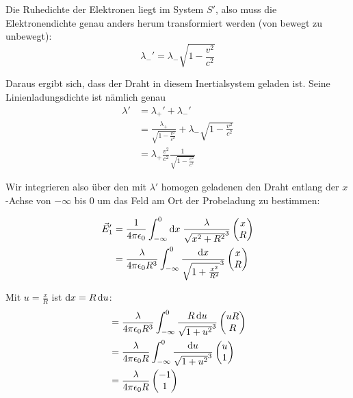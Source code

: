 \documentclass[a4paper,german,12pt,smallheadings]{scrartcl}
\begin{document}
Die Ruhedichte der Elektronen liegt im System $S'$, also muss die
Elektronendichte genau anders herum transformiert werden (von bewegt zu
unbewegt):
\begin{equation}
  \lambda_-' = \lambda_- \sqrt{1 - \frac{v^2}{c^2}}
\end{equation}

Daraus ergibt sich, dass der Draht in diesem Inertialsystem geladen ist. Seine
Linienladungsdichte ist nämlich genau
\begin{align*}
  \lambda' &= \lambda_+' + \lambda_-' \\
       &= \frac{\lambda_+}{\sqrt{1 - \frac{v^2}{c^2}}} + \lambda_- \sqrt{1 - \frac{v^2}{c^2}} \\
       &= \lambda_{+} \frac{v^2}{c^2} \frac{1}{\sqrt{1-\frac{v^2}{c^2}}}
\end{align*}

Wir integrieren also über den mit $\lambda'$ homogen geladenen den Draht
entlang der $x$-Achse von $-\infty$ bis $0$ um das Feld am Ort der Probeladung
zu bestimmen:

\begin{align*}
  \vec{E}'_1 &= \frac{1}{4 \pi \epsilon_0} \int_{-\infty}^0 \dif x \;
  \frac{\lambda}{\sqrt{x^2 + R^2}^3} \begin{pmatrix} x \\ R \end{pmatrix} \\
  &= \frac{\lambda}{4 \pi \epsilon_0 R^3} \int_{-\infty}^0
  \frac{\dif x}{\sqrt{1 + \frac{x^2}{R^2}}^3} \begin{pmatrix} x \\ R \end{pmatrix}
\end{align*}

Mit $u = \frac{x}{R}$ ist $\dif x = R \dif u$:
\begin{align*}
  &= \frac{\lambda}{4 \pi \epsilon_0 R^3} \int_{-\infty}^0
  \frac{R \dif u}{\sqrt{1 + u^2}^3} \begin{pmatrix} u R \\ R \end{pmatrix} \\
  &= \frac{\lambda}{4 \pi \epsilon_0 R} \int_{-\infty}^0
  \frac{\dif u}{\sqrt{1 + u^2}^3} \begin{pmatrix} u \\ 1 \end{pmatrix} \\
  &= \frac{\lambda}{4 \pi \epsilon_0 R} \begin{pmatrix} -1 \\ 1 \end{pmatrix}
\end{align*}
\end{document}

